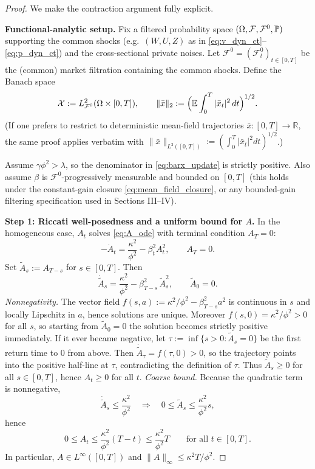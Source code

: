 \begin{proof}
We make the contraction argument fully explicit.

\medskip\noindent
\textbf{Functional-analytic setup.}
Fix a filtered probability space $(\Omega,\mathcal F,\mathcal F^0,\mathbb{P})$ supporting the common shocks
(e.g.\ $(W,U,Z)$ as in \eqref{eq:v_dyn_ct}--\eqref{eq:p_dyn_ct}) and the cross-sectional private noises.
Let $\mathcal F^0=(\mathcal F^0_t)_{t\in[0,T]}$ be the (common) market filtration containing the common shocks.
Define the Banach space
\[
\mathcal X := L^2_{\mathcal F^0}(\Omega\times[0,T]),\qquad
\|\bar x\|_2 := \Big(\mathbb{E}\int_0^T |\bar x_t|^2\,dt\Big)^{1/2}.
\]
(If one prefers to restrict to deterministic mean-field trajectories $\bar x:[0,T]\to\mathbb R$, the same proof applies
 verbatim with $\|\bar x\|_{L^2([0,T])}:=(\int_0^T|\bar x_t|^2dt)^{1/2}$.)

Assume $\gamma\phi^2>\lambda$, so the denominator in \eqref{eq:barx_update} is strictly positive.
Also assume $\beta$ is $\mathcal F^0$-progressively measurable and bounded on $[0,T]$ (this holds under the constant-gain
closure \eqref{eq:mean_field_closure}, or any bounded-gain filtering specification used in Sections III--IV).

\medskip\noindent
\textbf{Step 1: Riccati well-posedness and a uniform bound for $A$.}
In the homogeneous case, $A_t$ solves \eqref{eq:A_ode} with terminal condition $A_T=0$:
\[
-\dot A_t=\frac{\kappa^2}{\phi^2}-\beta_t^2 A_t^2,\qquad A_T=0.
\]
Set $\widetilde A_s := A_{T-s}$ for $s\in[0,T]$. Then
\[
\dot{\widetilde A}_s=\frac{\kappa^2}{\phi^2}-\beta_{T-s}^2\,\widetilde A_s^2,\qquad \widetilde A_0=0.
\]
\emph{Nonnegativity.} The vector field $f(s,a):=\kappa^2/\phi^2-\beta_{T-s}^2a^2$ is continuous in $s$ and locally
Lipschitz in $a$, hence solutions are unique. Moreover $f(s,0)=\kappa^2/\phi^2>0$ for all $s$, so starting from
$\widetilde A_0=0$ the solution becomes strictly positive immediately. If it ever became negative, let
$\tau:=\inf\{s>0:\widetilde A_s=0\}$ be the first return time to $0$ from above. Then $\dot{\widetilde A}_\tau=f(\tau,0)>0$,
so the trajectory points into the positive half-line at $\tau$, contradicting the definition of $\tau$. Thus
$\widetilde A_s\ge 0$ for all $s\in[0,T]$, hence $A_t\ge 0$ for all $t$.
\emph{Coarse bound.} Because the quadratic term is nonnegative,
\[
\dot{\widetilde A}_s \le \frac{\kappa^2}{\phi^2}
\quad\Longrightarrow\quad
0\le \widetilde A_s \le \frac{\kappa^2}{\phi^2}s,
\]
hence
\[
0\le A_t \le \frac{\kappa^2}{\phi^2}(T-t)\le \frac{\kappa^2}{\phi^2}T
\qquad\text{for all }t\in[0,T].
\]
In particular, $A\in L^\infty([0,T])$ and $\|A\|_\infty\le \kappa^2 T/\phi^2$.


\end{proof}
